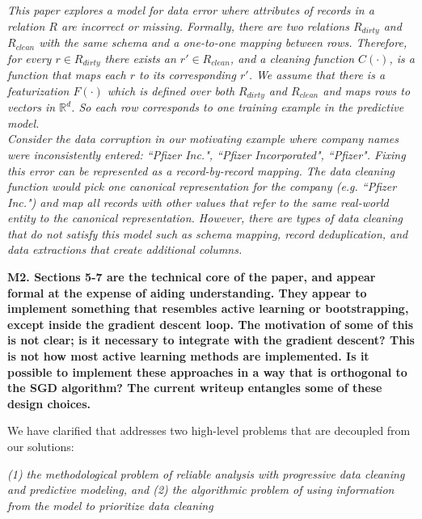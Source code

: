\emph{This paper explores a model for data error where attributes of records in a relation $R$ are incorrect or missing.
Formally, there are two relations $R_{dirty}$ and $R_{clean}$ with the same schema and a one-to-one mapping between rows.
Therefore, for every $r \in R_{dirty}$ there exists an $r' \in R_{clean}$, and a cleaning function $C(\cdot)$, is a function that maps each $r$ to its corresponding $r'$.
We assume that there is a featurization $F(\cdot)$ which is defined over both $R_{dirty}$ and $R_{clean}$ and maps rows to vectors in $\mathbb{R}^d$.
So each row corresponds to one training example in the predictive model.\\
Consider the data corruption in our motivating example where company names were inconsistently entered: ``Pfizer Inc.", ``Pfizer Incorporated", ``Pfizer".
Fixing this error can be represented as a record-by-record mapping.
The data cleaning function would pick one canonical representation for the company (e.g. ``Pfizer Inc.") and map all records with other values that refer to the same real-world entity to the canonical representation.
However, there are types of data cleaning that do not satisfy this model such as schema mapping, record deduplication, and data extractions that create additional columns.}

\vspace{0.5em}

\noindent\textbf{M2. Sections 5-7 are the technical core of the paper, and appear formal at the expense of aiding understanding. They appear to implement something that resembles active learning or bootstrapping, except inside the gradient descent loop. The motivation of some of this is not clear; is it necessary to integrate with the gradient descent? This is not how most active learning methods are implemented. Is it possible to implement these approaches in a way that is orthogonal to the SGD algorithm? The current writeup entangles some of these design choices.} 

We have clarified that \sys addresses two high-level problems that are decoupled from our solutions:

\emph{(1) the methodological problem of reliable analysis with progressive data cleaning and predictive modeling, and (2) the algorithmic problem of using information from the model to prioritize data cleaning} 

\vspace{0.5em}

